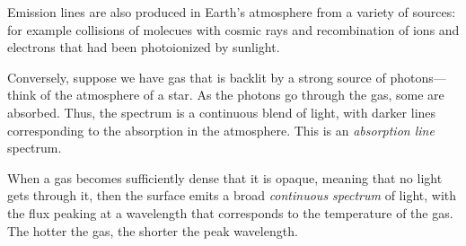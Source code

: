 Emission lines are also produced in Earth's atmosphere from a variety of sources: for example collisions of molecues with cosmic rays and recombination of ions and electrons that had been photoionized by sunlight.

Conversely, suppose we have gas that is backlit by a strong source of photons---think of the atmosphere of a star. As the photons go through the gas, some are absorbed. Thus, the spectrum is a continuous blend of light, with darker lines corresponding to the absorption in the atmosphere.  This is an \emph{absorption line} spectrum.

When a gas becomes sufficiently dense that it is opaque, meaning that no light gets through it, then the surface emits a broad \emph{continuous spectrum} of light, with the flux peaking at a wavelength that corresponds to the temperature of the gas. The hotter the gas, the shorter the peak wavelength.


